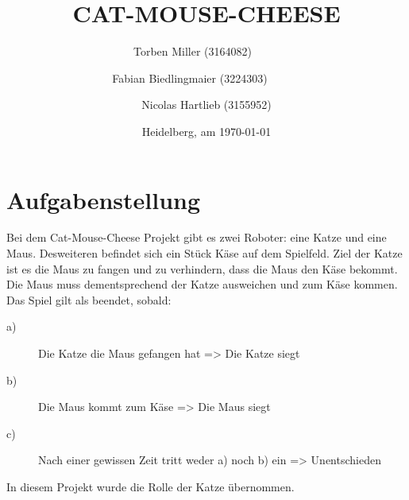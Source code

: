 \documentclass[
a4paper,     %
12pt         %
]{scrartcl}  %
\title{CAT-MOUSE-CHEESE}
\author{Torben Miller (3164082)\ \ \ \ \ \and
Fabian Biedlingmaier (3224303)\ \ \ \ \ \ \and
Nicolas Hartlieb (3155952)}
\date{Heidelberg, am \today{}}
\begin{document}

 \maketitle

 \newpage
 \tableofcontents

 \newpage
 \listoffigures


 \newpage



\section{Aufgabenstellung}
Bei dem \glqq Cat-Mouse-Cheese\grqq{} Projekt gibt es zwei Roboter: eine Katze und eine Maus. Desweiteren befindet sich ein Stück Käse auf dem Spielfeld.
Ziel der Katze ist es die Maus zu fangen und zu verhindern, dass die Maus den Käse bekommt.
Die Maus muss dementsprechend der Katze ausweichen und zum Käse kommen.
Das Spiel gilt als beendet, sobald:
\begin{description}
\item[a)]Die Katze die Maus gefangen hat => Die Katze siegt
\item[b)] Die Maus kommt zum Käse => Die Maus siegt
\item[c)] Nach einer gewissen Zeit tritt weder a) noch b) ein => Unentschieden
\end{description}
In diesem Projekt wurde die Rolle der Katze übernommen.
\end{document}

